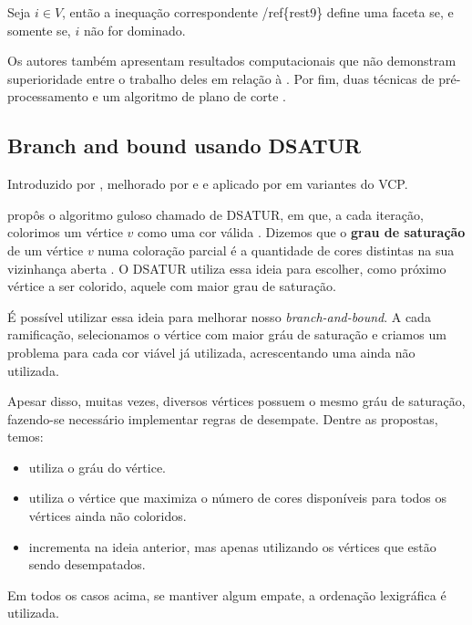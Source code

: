 \documentclass[11pt]{article}
\begin{document}
\begin{prep}
\textcite{Hansen2009Setcoveringpacking} Seja \(i \in V\), então a inequação correspondente /ref\{rest9\} define uma faceta se, e somente se, \(i\) não for dominado.
\end{prep}

Os autores também apresentam resultados computacionais que não demonstram superioridade entre o trabalho deles em relação à \textcite{Mehrotra1996ColumnGenerationApproach}.
Por fim, duas técnicas de pré-processamento e um algoritmo de plano de corte .
\subsection{Branch and bound usando DSATUR}
\label{sec:orgde4c1db}
Introduzido por \textcite{Brelaz1979Newmethodscolor}, melhorado por \textcite{Sewell1996improvedalgorithmexact} e \textcite{Segundo2012newDSATURbased} e aplicado por \textcite{MendezDiaz2015DSATURbasedalgorithm} em variantes do VCP.

\textcite{Brelaz1979Newmethodscolor} propôs o algoritmo guloso chamado de DSATUR, em que, a cada iteração, colorimos um vértice \(v\) como uma cor válida .
Dizemos que o \textbf{grau de saturação}  de um vértice \(v\) numa coloração parcial  é a quantidade de cores distintas na sua vizinhança aberta .
O DSATUR utiliza essa ideia para escolher, como próximo vértice a ser colorido, aquele com maior grau de saturação.

É possível utilizar essa ideia para melhorar nosso \emph{branch-and-bound}.
A cada ramificação, selecionamos o vértice com maior gráu de saturação e criamos um problema para cada cor viável já utilizada, acrescentando uma ainda não utilizada.

Apesar disso, muitas vezes, diversos vértices possuem o mesmo gráu de saturação, fazendo-se necessário implementar regras de desempate.
Dentre as propostas, temos:
\begin{itemize}
\item \textcite{Brelaz1979Newmethodscolor} utiliza o gráu do vértice.
\item \textcite{Sewell1996improvedalgorithmexact} utiliza o vértice que maximiza o número de cores disponíveis para todos os vértices ainda não coloridos.
\item \textcite{Segundo2012newDSATURbased} incrementa na ideia anterior, mas apenas utilizando os vértices que estão sendo desempatados.
\end{itemize}
Em todos os casos acima, se mantiver algum empate, a ordenação lexigráfica é utilizada.
\end{document}
